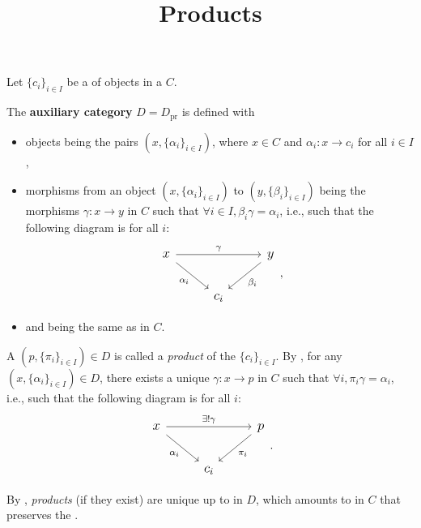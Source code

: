 \documentclass{atomic}
\title{Products}
\begin{document}
    \pagestyle{plain}  \noindent
    Let $\{ c_i \}_{i \in I}$ be a  of objects in a  $C$.
    \begin{definition} \label{auxiliary-category}
        The \textbf{auxiliary category} $D = D_\text{pr}$ is defined with
        \begin{itemize}
            \item objects being the pairs $\left( x, \{\alpha_i\}_{i \in I} \right)$, where $x \in C$ and $\alpha_i : x \to c_i$ for all $i \in I$,
            \item morphisms from an object $\left( x, \{\alpha_i\}_{i \in I} \right)$ to $\left( y, \{\beta_i\}_{i \in I} \right)$ being the morphisms $\gamma : x \to y$ in $C$ such that $\forall i \in I, \beta_i\gamma = \alpha_i$, i.e., such that the following diagram is  for all $i$:
            $$\large\begin{tikzcd}
                x \arrow[dr, swap, "\alpha_i"] \arrow[rr, "\gamma"] & & y \arrow[dl, "\beta_i"] \\
                & c_i
            \end{tikzcd},$$
        \item and  being the same as in $C$.
        \end{itemize}
    \end{definition}

    A  $\left( p, \{ \pi_i \}_{i \in I} \right) \in D$ is called a \textit{product} of the  $\{ c_i \}_{i \in I}$. By , for any $\left( x, \{\alpha_i\}_{i \in I} \right) \in D$, there exists a unique $\gamma : x \to p$ in $C$ such that $\forall i, \pi_i\gamma = \alpha_i$, i.e., such that the following diagram is  for all $i$:
    $$\large\begin{tikzcd}
        x \arrow[dr, swap, "\alpha_i"] \arrow[rr, "\exists!\gamma"] & & p \arrow[dl, "\pi_i"] \\
        & c_i
    \end{tikzcd}.$$

    \begin{remark*}
        By  , \textit{products} (if they exist) are unique up to  in $D$, which amounts to  in $C$ that preserves the .
    \end{remark*}
\end{document}
